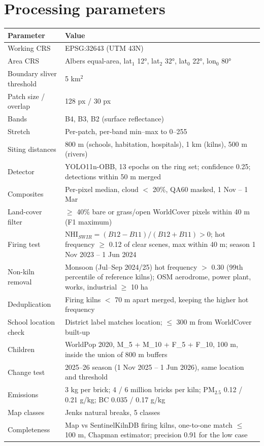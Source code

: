 \documentclass[11pt,a4paper]{article}
\begin{document}
\appendix
\section{Processing parameters}
\begin{table}[H]
\centering\small
\begin{tabular}{@{}P{5cm} P{9cm}@{}}
\toprule
Parameter & Value \\
\midrule
Working CRS & EPSG:32643 (UTM 43N) \\
Area CRS & Albers equal-area, lat$_1$ 12°, lat$_2$ 32°, lat$_0$ 22°, lon$_0$ 80° \\
Boundary sliver threshold & 5 km$^2$ \\
Patch size / overlap & 128 px / 30 px \\
Bands & B4, B3, B2 (surface reflectance) \\
Stretch & Per-patch, per-band min--max to 0--255 \\
Siting distances & 800 m (schools, habitation, hospitals), 1 km (kilns), 500 m (rivers) \\
Detector & YOLO11n-OBB, 13 epochs on the ring set; confidence 0.25; detections within 50 m merged \\
Composites & Per-pixel median, cloud $<$ 20\%, QA60 masked, 1 Nov -- 1 Mar \\
Land-cover filter & $\geq$ 40\% bare or grass/open WorldCover pixels within 40 m (F1 maximum) \\
Firing test & NHI$_{SWIR} = (B12-B11)/(B12+B11) > 0$; hot frequency $\geq$ 0.12 of clear scenes, max within 40 m; season 1 Nov 2023 -- 1 Jun 2024 \\
Non-kiln removal & Monsoon (Jul--Sep 2024/25) hot frequency $>$ 0.30 (99th percentile of reference kilns); OSM aerodrome, power plant, works, industrial $\geq$ 10 ha \\
Deduplication & Firing kilns $<$ 70 m apart merged, keeping the higher hot frequency \\
School location check & District label matches location; $\leq$ 300 m from WorldCover built-up \\
Children & WorldPop 2020, M\_5 + M\_10 + F\_5 + F\_10, 100 m, inside the union of 800 m buffers \\
Change test & 2025--26 season (1 Nov 2025 -- 1 Jun 2026), same location and threshold \\
Emissions & 3 kg per brick; 4 / 6 million bricks per kiln; PM$_{2.5}$ 0.12 / 0.21 g/kg; BC 0.035 / 0.17 g/kg \\
Map classes & Jenks natural breaks, 5 classes \\
Completeness & Map vs SentinelKilnDB firing kilns, one-to-one match $\leq$ 100 m, Chapman estimator; precision 0.91 for the low case \\
\bottomrule
\end{tabular}
\end{table}
\end{document}
